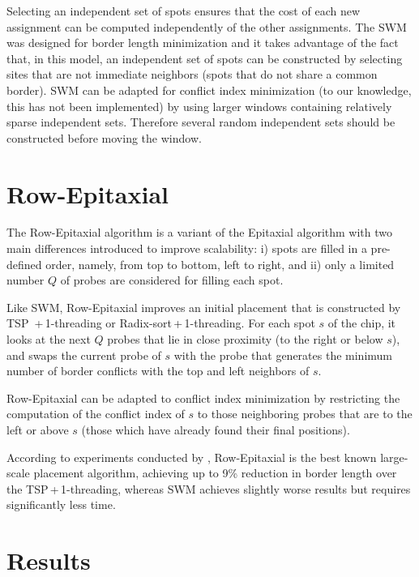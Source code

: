 Selecting an independent set of spots ensures that the cost of each new
assignment can be computed independently of the other assignments. The SWM was
designed for border length minimization and it takes advantage of the fact that,
in this model, an independent set of spots can be constructed by selecting sites
that are not immediate neighbors (spots that do not share a common border). SWM
can be adapted for conflict index minimization (to our knowledge, this has not
been implemented) by using larger windows containing relatively sparse
independent sets. Therefore several random independent sets should be
constructed before moving the window.

\section{Row-Epitaxial}
\label{sec:placement_reptx}

The Row-Epitaxial algorithm is a variant of the Epitaxial algorithm with two
main differences introduced to improve scalability: i) spots are filled in a
pre-defined order, namely, from top to bottom, left to right, and ii) only a
limited number $Q$ of probes are considered for filling each spot.

Like SWM, Row-Epitaxial improves an initial placement that is constructed by TSP
\,+\,1-threading or Radix-sort\,+\,1-threading. For each spot $s$ of the chip,
it looks at the next $Q$ probes that lie in close proximity (to the right or
below $s$), and swaps the current probe of $s$ with the probe that generates the
minimum number of border conflicts with the top and left neighbors of $s$.

Row-Epitaxial can be adapted to conflict index minimization by restricting the
computation of the conflict index of $s$ to those neighboring probes that are to
the left or above $s$ (those which have already found their final positions).

According to experiments conducted by \citet{Kahng2003}, Row-Epitaxial is the
best known large-scale placement algorithm, achieving up to 9\% reduction in
border length over the TSP\,+\,1-threading, whereas SWM achieves slightly worse
results but requires significantly less time.

\section{Results}
\label{sec:placement_results}

